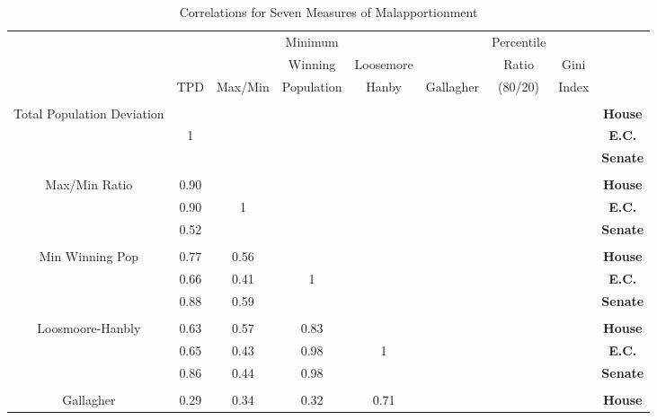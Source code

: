
\begin{landscape}

\begin{table}[!htbp] \centering 
  \caption{Correlations for Seven Measures of Malapportionment} 
  \label{tab:corr} 
\begin{tabular}{c|c|c|c|c|c|c|c|c}
 &  &  & Minimum &  &  & Percentile & &   \\ 
  &   &   & Winning & Loosemore &  & Ratio & Gini &   \\ 
  & TPD & Max/Min & Population & Hanby & Gallagher & (80/20) & Index & \\ 
\hline \\[-1.8ex]
{Total Population Deviation} &  &  &  &  &  &  & & \footnotesize{\textbf{House}} \\ 
{} & 1 &  &  &  &  &  & & \footnotesize{\textbf{E.C.}} \\ 
{ } &  &  &  &  &  &  & & \footnotesize{\textbf{Senate}} \\ 
\hline \\[-1.8ex]
{Max/Min Ratio} & 0.90 &  &  &  &  &  & & \footnotesize{\textbf{House}} \\ 
{ } & 0.90 & 1 &  &  &  &  & & \footnotesize{\textbf{E.C.}} \\ 
{ } & 0.52 &  &  &  &  &  & & \footnotesize{\textbf{Senate}} \\ 
\hline \\[-1.8ex] 
{Min Winning Pop} & 0.77 & 0.56 &  &  &  &  & & \footnotesize{\textbf{House}} \\ 
{  } & 0.66 & 0.41 & 1 &  &  &  & & \footnotesize{\textbf{E.C.}} \\ 
{  } & 0.88 & 0.59 &  &  &  &  & & \footnotesize{\textbf{Senate}} \\ 
\hline \\[-1.8ex] 
{Loosmoore-Hanbly} & 0.63 & 0.57 & 0.83 &  &  &  & & \footnotesize{\textbf{House}} \\ 
{ } & 0.65 & 0.43 & 0.98 & 1 &  &  & & \footnotesize{\textbf{E.C.}} \\ 
{} & 0.86 & 0.44 & 0.98 &  &  &  & & \footnotesize{\textbf{Senate}} \\ 
\hline \\[-1.8ex] 
{Gallagher} & 0.29 & 0.34 & 0.32 & 0.71 &  &  & & \footnotesize{\textbf{House}} \\ 

\end{tabular}
\end{table}
\end{landscape}

